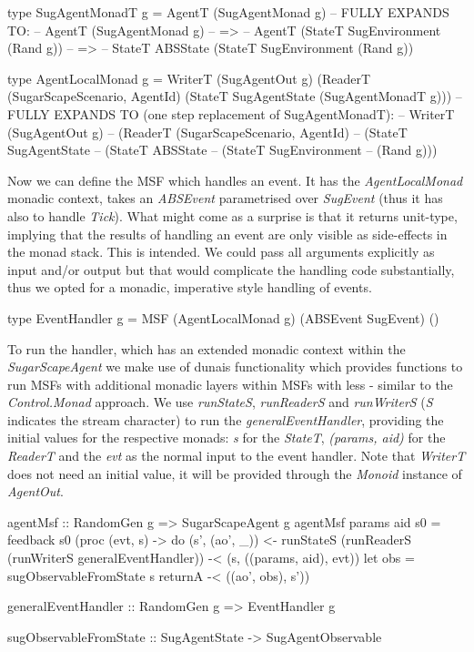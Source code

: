 \begin{HaskellCode}
type SugAgentMonadT g = AgentT (SugAgentMonad g)
-- FULLY EXPANDS TO:
-- AgentT (SugAgentMonad g)
--  =>
-- AgentT (StateT SugEnvironment (Rand g))
--  =>
-- StateT ABSState (StateT SugEnvironment (Rand g))

type AgentLocalMonad g = WriterT (SugAgentOut g) 
                           (ReaderT (SugarScapeScenario, AgentId) 
                             (StateT SugAgentState (SugAgentMonadT g)))
-- FULLY EXPANDS TO (one step replacement of SugAgentMonadT):
-- WriterT (SugAgentOut g) 
--  (ReaderT (SugarScapeScenario, AgentId) 
--    (StateT SugAgentState 
--      (StateT ABSState 
--        (StateT SugEnvironment 
--          (Rand g)))  
\end{HaskellCode}

Now we can define the MSF which handles an event. It has the \textit{AgentLocalMonad} monadic context, takes an \textit{ABSEvent} parametrised over \textit{SugEvent} (thus it has also to handle \textit{Tick}). What might come as a surprise is that it returns unit-type, implying that the results of handling an event are only visible as side-effects in the monad stack. This is intended. We could pass all arguments explicitly as input and/or output but that would complicate the handling code substantially, thus we opted for a monadic, imperative style handling of events.

\begin{HaskellCode}
type EventHandler g = MSF (AgentLocalMonad g) (ABSEvent SugEvent) ()
\end{HaskellCode}

To run the handler, which has an extended monadic context within the \textit{SugarScapeAgent} we make use of dunais functionality which provides functions to run MSFs with additional monadic layers within MSFs with less - similar to the \textit{Control.Monad} approach. We use \textit{runStateS}, \textit{runReaderS} and \textit{runWriterS} (\textit{S} indicates the stream character) to run the \textit{generalEventHandler}, providing the initial values for the respective monads: \textit{s} for the \textit{StateT}, \textit{(params, aid)} for the \textit{ReaderT} and the \textit{evt} as the normal input to the event handler. Note that \textit{WriterT} does not need an initial value, it will be provided through the \textit{Monoid} instance of \textit{AgentOut}.

\begin{HaskellCode}
agentMsf :: RandomGen g => SugarScapeAgent g
agentMsf params aid s0 = feedback s0 (proc (evt, s) -> do
  (s', (ao', _)) <- runStateS (runReaderS (runWriterS generalEventHandler)) -< (s, ((params, aid), evt))
  let obs = sugObservableFromState s
  returnA -< ((ao', obs), s'))

generalEventHandler :: RandomGen g => EventHandler g

sugObservableFromState :: SugAgentState -> SugAgentObservable
\end{HaskellCode}

